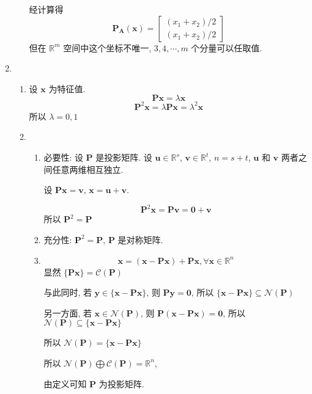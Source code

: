 \documentclass[11pt,letter,notitlepage]{article}
\newcommand{\proj}[2]{\textbf{P}_{#2} (#1)}
\begin{document}
\begin{solution}
\begin{enumerate}
\begin{enumerate}
                        经计算得 $$\proj{\mathbf{x}}{\mathbf{A}}=\begin{bmatrix}
                                (x_1+x_2)/2 \\(x_1+x_2)/2
                            \end{bmatrix}$$
                        但在 $\mathbb{R}^m$ 空间中这个坐标不唯一, $3,4,\cdots,m$ 个分量可以任取值.
              \end{enumerate}
        \item \begin{enumerate}
                  \item 设 $\mathbf{x}$ 为特征值.
                        $$\mathbf{P}\mathbf{x}=\lambda\mathbf{x}$$
                        $$\mathbf{P}^2\mathbf{x}=\lambda\mathbf{P}\mathbf{x}=\lambda^2\mathbf{x}$$
                        所以 $\lambda=0,1$

                  \item \begin{enumerate}
                            \item 必要性: 设 $\mathbf{P}$ 是投影矩阵.
                                  设 $\mathbf{u}\in\mathbb{R}^s$, $\mathbf{v}\in\mathbb{R}^t$, $n=s+t$, $\mathbf{u}$ 和 $\mathbf{v}$ 两者之间任意两维相互独立.

                                  设 $\mathbf{P}\mathbf{x}=\mathbf{v}$, $\mathbf{x}=\mathbf{u}+\mathbf{v}$.\

                                  $$\mathbf{P}^2\mathbf{x}=\mathbf{P}\mathbf{v}=\mathbf{0}+\mathbf{v}$$
                                  所以 $\mathbf{P}^2=\mathbf{P}$
                            \item 充分性: $\mathbf{P}^2=\mathbf{P}$, $\mathbf{P}$ 是对称矩阵.
                            \item $$\mathbf{x}=(\mathbf{x}-\mathbf{P}\mathbf{x})+\mathbf{P}\mathbf{x},\forall \mathbf{x}\in\mathbb{R}^n$$
                                  显然 $\{\mathbf{P}\mathbf{x}\}=\mathcal{C}(\mathbf{P})$

                                  与此同时, 若 $\mathbf{y}\in\{\mathbf{x}-\mathbf{P}\mathbf{x}\}$, 则 $\mathbf{P}\mathbf{y}=\mathbf{0}$, 所以 $\{\mathbf{x}-\mathbf{P}\mathbf{x}\}\subseteq\mathcal{N}(\mathbf{P})$

                                  另一方面, 若 $\mathbf{x}\in\mathcal{N}(\mathbf{P})$, 则 $\mathbf{P}(\mathbf{x}-\mathbf{P}\mathbf{x})=\mathbf{0}$, 所以 $\mathcal{N}(\mathbf{P})\subseteq\{\mathbf{x}-\mathbf{P}\mathbf{x}\}$

                                  所以 $\mathcal{N}(\mathbf{P})=\{\mathbf{x}-\mathbf{P}\mathbf{x}\}$

                                  所以 $\mathcal{N}(\mathbf{P})\bigoplus\mathcal{C}(\mathbf{P})=\mathbb{R}^n$,

                                  由定义可知 $\mathbf{P}$ 为投影矩阵.
                        \end{enumerate}

              \end{enumerate}
    \end{enumerate}
\end{solution}
\end{document}
